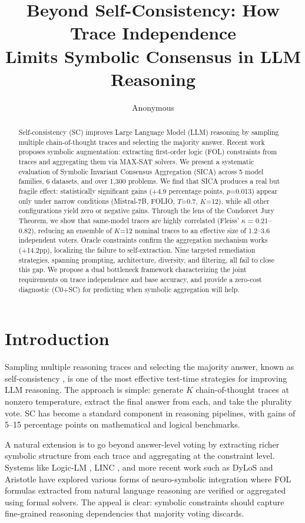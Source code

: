 \documentclass[11pt,a4paper]{article}
\title{Beyond Self-Consistency: How Trace Independence\\Limits Symbolic Consensus in LLM Reasoning}
\author{Anonymous}
\begin{document}
\maketitle

\begin{abstract}
Self-consistency (SC) improves Large Language Model (LLM) reasoning by sampling multiple chain-of-thought traces and selecting the majority answer. Recent work proposes symbolic augmentation: extracting first-order logic (FOL) constraints from traces and aggregating them via MAX-SAT solvers. We present a systematic evaluation of Symbolic Invariant Consensus Aggregation (SICA) across 5 model families, 6 datasets, and over 1,300 problems. We find that SICA produces a real but fragile effect: statistically significant gains (+4.9 percentage points, $p$=0.013) appear only under narrow conditions (Mistral-7B, FOLIO, $T$=0.7, $K$=12), while all other configurations yield zero or negative gains. Through the lens of the Condorcet Jury Theorem, we show that same-model traces are highly correlated (Fleiss' $\kappa$ = 0.21--0.82), reducing an ensemble of $K$=12 nominal traces to an effective size of 1.2--3.6 independent voters. Oracle constraints confirm the aggregation mechanism works (+14.2pp), localizing the failure to self-extraction. Nine targeted remediation strategies, spanning prompting, architecture, diversity, and filtering, all fail to close this gap. We propose a dual bottleneck framework characterizing the joint requirements on trace independence and base accuracy, and provide a zero-cost diagnostic (C0+SC) for predicting when symbolic aggregation will help.
\end{abstract}

\section{Introduction}

Sampling multiple reasoning traces and selecting the majority answer, known as self-consistency \cite{wang2023selfconsistency}, is one of the most effective test-time strategies for improving LLM reasoning. The approach is simple: generate $K$ chain-of-thought traces at nonzero temperature, extract the final answer from each, and take the plurality vote. SC has become a standard component in reasoning pipelines, with gains of 5--15 percentage points on mathematical and logical benchmarks.

A natural extension is to go beyond answer-level voting by extracting richer symbolic structure from each trace and aggregating at the constraint level. Systems like Logic-LM \cite{pan2023logiclm}, LINC \cite{olausson2023linc}, and more recent work such as DyLoS and Aristotle have explored various forms of neuro-symbolic integration where FOL formulas extracted from natural language reasoning are verified or aggregated using formal solvers. The appeal is clear: symbolic constraints should capture fine-grained reasoning dependencies that majority voting discards.
\end{document}
